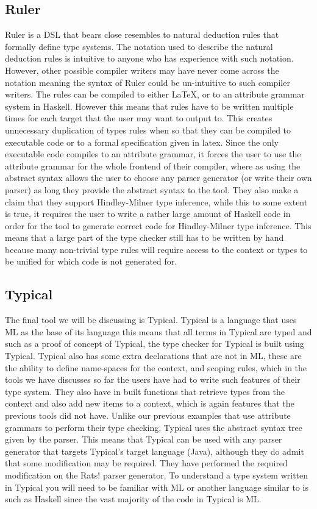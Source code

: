 \subsection{Ruler}
Ruler is a DSL that bears close resembles to natural deduction rules that formally define type systems\cite{dijkstra2006ruler}.
The notation used to describe the natural deduction rules is intuitive to anyone who has experience with such notation.
However, other possible compiler writers may have never come across the notation meaning the syntax of Ruler could be un-intuitive to such compiler writers.
The rules can be compiled to either \LaTeX, or to an attribute grammar system in Haskell.
However this means that rules have to be written multiple times for each target that the user may want to output to.
This creates unnecessary duplication of types rules when so that they can be compiled to executable code or to a formal specification given in latex.
Since the only executable code compiles to an attribute grammar, it forces the user to use the attribute grammar for the whole frontend of their compiler, where as using the abstract syntax allows the user to choose any parser generator (or write their own parser) as long they provide the abstract syntax to the tool.
They also make a claim that they support Hindley-Milner type inference, while this to some extent is true, it requires the user to write a rather large amount of Haskell code in order for the tool to generate correct code for Hindley-Milner type inference.
This means that a large part of the type checker still has to be written by hand because many non-trivial type rules will require access to the context or types to be unified for which code is not generated for.

\subsection{Typical}
\label{sec:typical}
The final tool we will be discussing is Typical\cite{grimm2007typical}.
Typical is a language that uses ML\cite{milner1997definition} as the base of its language this means that all terms in Typical are typed and such as a proof of concept of Typical, the type checker for Typical is built using Typical.
Typical also has some extra declarations that are not in ML, these are the ability to define name-spaces for the context, and scoping rules, which in the tools we have discusses so far the users have had to write such features of their type system.
They also have in built functions that retrieve types from the context and also add new items to a context, which is again features that the previous tools did not have.
Unlike our previous examples that use attribute grammars to perform their type checking, Typical uses the abstract syntax tree given by the parser.
This means that Typical can be used with any parser generator that targets Typical's target language (Java), although they do admit that some modification may be required.
They have performed the required modification on the Rats! parser generator\cite{Grimm:2006:BET:1133255.1133987}.
To understand a type system written in Typical you will need to be familiar with ML or another language similar to is such as Haskell since the vast majority of the code in Typical is ML.
